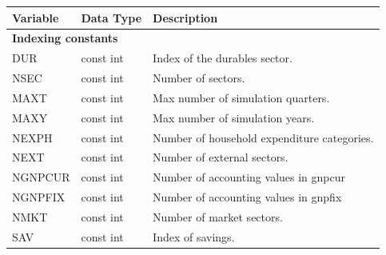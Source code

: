 \documentclass{article}
\begin{document}
\begin{longtable}{p{}p{}p{}}
\toprule
\textbf{Variable} & \textbf{Data Type} & \textbf{Description} \\
\midrule
\endhead

\multicolumn{3}{l}{\textbf{Indexing constants}} \\
\midrule
DUR & const int & Index of the durables sector. \\
NSEC & const int & Number of sectors. \\
MAXT & const int & Max number of simulation quarters. \\
MAXY & const int & Max number of simulation years. \\
NEXPH & const int & Number of household expenditure categories. \\
NEXT & const int & Number of external sectors. \\
NGNPCUR & const int & Number of accounting values in gnpcur \\
NGNPFIX & const int & Number of accounting values in gnpfix \\
NMKT & const int & Number of market sectors. \\
SAV & const int & Index of savings. \\
\midrule



\end{longtable}
\end{document}
